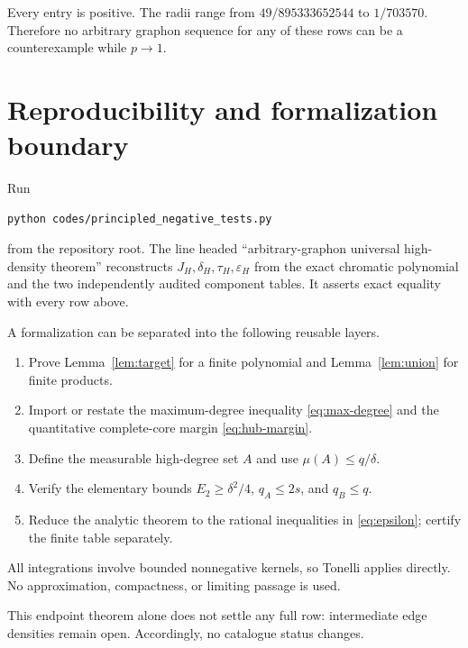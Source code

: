 \documentclass[11pt]{article}
\begin{document}
Every entry is positive.  The radii range from
$49/895333652544$ to $1/703570$.  Therefore no arbitrary graphon sequence for
any of these rows can be a counterexample while $p\to1$.

\section{Reproducibility and formalization boundary}

Run
\begin{verbatim}
python codes/principled_negative_tests.py
\end{verbatim}
from the repository root.  The line headed ``arbitrary-graphon universal
high-density theorem'' reconstructs $J_H,\delta_H,\tau_H,\varepsilon_H$ from
the exact chromatic polynomial and the two independently audited component
tables.  It asserts exact equality with every row above.

A formalization can be separated into the following reusable layers.
\begin{enumerate}
 \item Prove Lemma~\ref{lem:target} for a finite polynomial and
 Lemma~\ref{lem:union} for finite products.
 \item Import or restate the maximum-degree inequality
 \eqref{eq:max-degree} and the quantitative complete-core margin
 \eqref{eq:hub-margin}.
 \item Define the measurable high-degree set $A$ and use
 $\mu(A)\leq q/\delta$.
 \item Verify the elementary bounds $E_2\geq\delta^2/4$,
 $q_A\leq2s$, and $q_B\leq q$.
 \item Reduce the analytic theorem to the rational inequalities in
 \eqref{eq:epsilon}; certify the finite table separately.
\end{enumerate}
All integrations involve bounded nonnegative kernels, so Tonelli applies
directly.  No approximation, compactness, or limiting passage is used.

This endpoint theorem alone does not settle any full row: intermediate edge
densities remain open.  Accordingly, no catalogue status changes.
\end{document}
